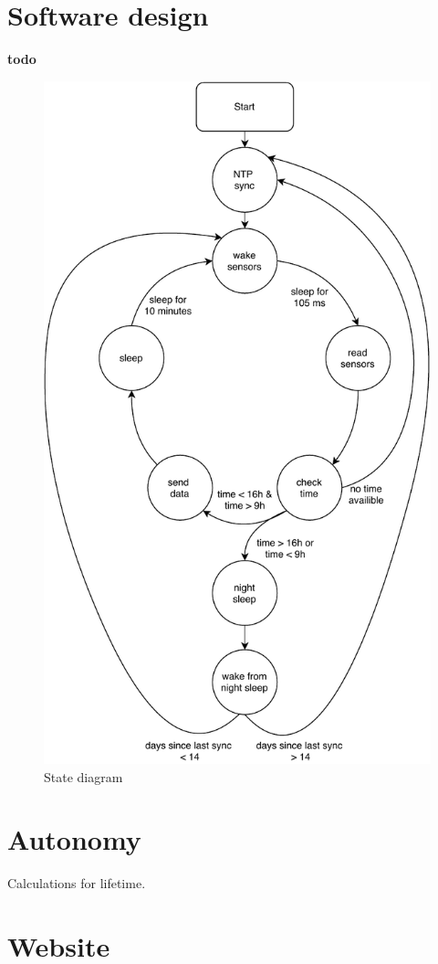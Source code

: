 \documentclass[11pt,a4paper]{article}
\begin{document}
\section{Software design}
\textbf{todo}
\begin{figure}[H]
	\centering
	\includegraphics[width=0.8\linewidth]{statendiagram.pdf}
	\caption{State diagram}
	\label{fig:statediagram}
\end{figure}

\section{Autonomy}
Calculations for lifetime.

\section{Website}
\end{document}
